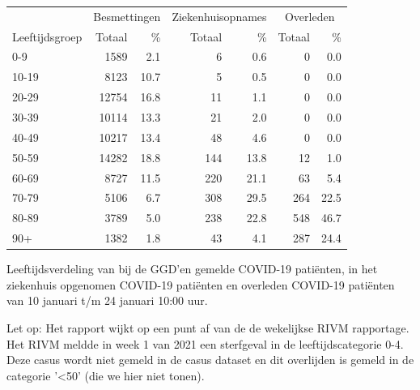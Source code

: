 \documentclass[
  english,
  man,floatsintext]{apa6}
\begin{document}
\begin{table}[H]
\centering\begingroup\fontsize{11}{13}\selectfont

\begin{threeparttable}
\begin{tabular}{lrrrrrr}
\toprule
\multicolumn{1}{c}{ } & \multicolumn{2}{c}{Besmettingen} & \multicolumn{2}{c}{Ziekenhuisopnames} & \multicolumn{2}{c}{Overleden} \\
\cmidrule(l{3pt}r{3pt}){2-3} \cmidrule(l{3pt}r{3pt}){4-5} \cmidrule(l{3pt}r{3pt}){6-7}
Leeftijdsgroep & Totaal & \% & Totaal & \% & Totaal & \%\\
\midrule
0-9 & 1589 & 2.1 & 6 & 0.6 & 0 & 0.0\\
10-19 & 8123 & 10.7 & 5 & 0.5 & 0 & 0.0\\
20-29 & 12754 & 16.8 & 11 & 1.1 & 0 & 0.0\\
30-39 & 10114 & 13.3 & 21 & 2.0 & 0 & 0.0\\
40-49 & 10217 & 13.4 & 48 & 4.6 & 0 & 0.0\\
50-59 & 14282 & 18.8 & 144 & 13.8 & 12 & 1.0\\
60-69 & 8727 & 11.5 & 220 & 21.1 & 63 & 5.4\\
70-79 & 5106 & 6.7 & 308 & 29.5 & 264 & 22.5\\
80-89 & 3789 & 5.0 & 238 & 22.8 & 548 & 46.7\\
90+ & 1382 & 1.8 & 43 & 4.1 & 287 & 24.4\\
\bottomrule
\end{tabular}
\begin{tablenotes}
\item[1] Leeftijdsverdeling van bij de GGD’en gemelde COVID-19 patiënten, in het ziekenhuis opgenomen COVID-19 patiënten en overleden COVID-19 patiënten van 10 januari t/m 24 januari 10:00 uur.
\item[2] Let op: Het rapport wijkt op een punt af van de de wekelijkse RIVM rapportage. Het RIVM meldde in week 1 van 2021 een sterfgeval in de leeftijdscategorie 0-4. Deze casus wordt niet gemeld in de casus dataset en dit overlijden is gemeld in de categorie '<50' (die we hier niet tonen).
\end{tablenotes}
\end{threeparttable}
\endgroup{}
\end{table}

\newpage
\end{document}
